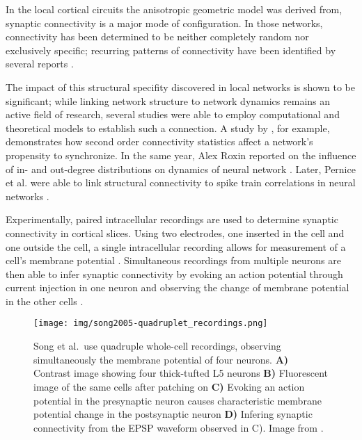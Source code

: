 In the local cortical circuits the anisotropic geometric model was
 derived from, synaptic connectivity
is a major mode of configuration.  In those networks, connectivity has
been determined to be neither completely random nor exclusively
specific; recurring patterns of connectivity have been identified by
several reports \parencite{Sporns2004,Song2005,Perin2011}.

The impact of this structural specifity discovered in local networks
is shown to be significant; while linking network structure to network
dynamics remains an active field of research, several studies were
able to employ computational and theoretical models to establish such
a connection. A study by \textcite{Zhao2011}, for example,
demonstrates how second order connectivity statistics affect a
network's propensity to synchronize. In the same year, Alex Roxin
reported on the influence of in- and out-degree distributions on
dynamics of neural network \parencite{Roxin2011}. Later,
Pernice et al. were able to link structural connectivity to spike
train correlations in neural networks
\parencite{Pernice2011}.

Experimentally, paired intracellular recordings are used to
 determine
synaptic connectivity in cortical slices. Using two electrodes, one
inserted in the cell and one outside the cell, a single intracellular
recording allows for measurement of a cell's membrane potential
\parencites[Chapter 3]{Brette_Neural-activity}[]{Scholarpedia-IntracellularRecording}. Simultaneous
recordings from multiple neurons are then able to infer synaptic
connectivity by evoking an action potential through current injection
in one neuron and observing the change of membrane potential in the
other cells \parencite{Song2005}.

\begin{figure}[H]
  \centering
  \texttt{[image: img/song2005-quadruplet\_recordings.png]}
  \caption{Song et al.\ use quadruple whole-cell recordings, observing
    simultaneously the membrane potential of four neurons.
    \textbf{A)} Contrast image showing four thick-tufted L5 neurons
    \textbf{B)} Fluorescent image of the same cells after patching on
    \textbf{C)} Evoking an action potential in the presynaptic neuron
    causes characteristic membrane potential change in the
    postsynaptic neuron \textbf{D)} Infering synaptic connectivity
    from the EPSP waveform observed in C). Image from \textcite{Song2005}.
  }
\end{figure}


